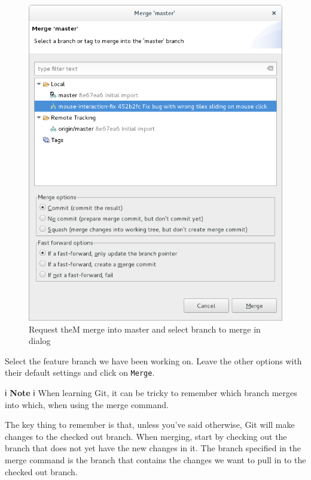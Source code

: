 \documentclass[
]{book}
\begin{document}
\begin{figure}

{\centering \includegraphics[width=1\linewidth]{images/requestTheMergeIntoMasterAndSelectbranchToMergeIn} 

}

\caption{Request theM merge into master and select branch to merge in dialog}\label{fig:requestTheMergeIntoMasterAndSelectbranchToMergeIn-fig}
\end{figure}

Select the feature branch we have been working on. Leave the other options with their default settings and click on \texttt{Merge}.

ℹ️ \textbf{Note} ℹ️
When learning Git, it can be tricky to remember which branch merges into which, when using the merge command.

The key thing to remember is that, unless you've said otherwise, Git will make changes to the checked out branch. When merging, start by checking out the branch that does not yet have the new changes in it. The branch specified in the merge command is the branch that contains the changes we want to pull in to the checked out branch.
\end{document}
